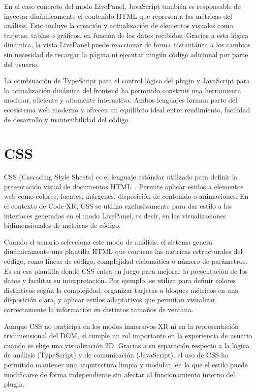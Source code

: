 \documentclass[a4paper, 12pt]{book}
\begin{document}
En el caso concreto del modo LivePanel, JavaScript también es responsable de inyectar dinámicamente el contenido HTML que representa las métricas del análisis. Esto incluye la creación y actualización de elementos visuales como tarjetas, tablas o gráficos, en función de los datos recibidos. Gracias a esta lógica dinámica, la vista LivePanel puede reaccionar de forma instantánea a los cambios sin necesidad de recargar la página ni ejecutar ningún código adicional por parte del usuario.

La combinación de TypeScript para el control lógico del plugin y JavaScript para la actualización dinámica del frontend ha permitido construir una herramienta modular, eficiente y altamente interactiva. Ambos lenguajes forman parte del ecosistema web moderno y ofrecen un equilibrio ideal entre rendimiento, facilidad de desarrollo y mantenibilidad del código.

\section{CSS}
\label{sec:css}

CSS (Cascading Style Sheets) es el lenguaje estándar utilizado para definir la presentación visual de documentos HTML~\cite{css}. Permite aplicar estilos a elementos web como colores, fuentes, márgenes, disposición de contenido o animaciones. En el contexto de Code-XR, CSS se utiliza exclusivamente para dar estilo a las interfaces generadas en el modo LivePanel, es decir, en las visualizaciones bidimensionales de métricas de código.

Cuando el usuario selecciona este modo de análisis, el sistema genera dinámicamente una plantilla HTML que contiene las métricas estructurales del código, como líneas de código, complejidad ciclomática o número de parámetros. Es en esa plantilla donde CSS entra en juego para mejorar la presentación de los datos y facilitar su interpretación. Por ejemplo, se utiliza para definir colores distintivos según la complejidad, organizar tarjetas o bloques métricos en una disposición clara, y aplicar estilos adaptativos que permitan visualizar correctamente la información en distintos tamaños de ventana.

Aunque CSS no participa en los modos inmersivos XR ni en la representación tridimensional del DOM, sí cumple un rol importante en la experiencia de usuario cuando se elige una visualización 2D. Gracias a su separación respecto a la lógica de análisis (TypeScript) y de comunicación (JavaScript), el uso de CSS ha permitido mantener una arquitectura limpia y modular, en la que el estilo puede modificarse de forma independiente sin afectar al funcionamiento interno del plugin.
\end{document}
